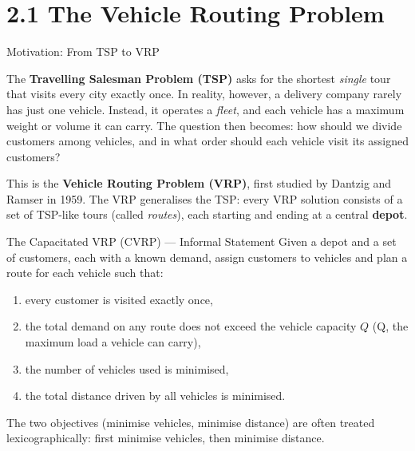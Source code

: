 \documentclass[aspectratio=169,10pt]{beamer}
\begin{document}
\section{2.1 The Vehicle Routing Problem}

\begin{frame}[allowframebreaks]{Motivation: From TSP to VRP}

  The \textbf{Travelling Salesman Problem (TSP)} asks for the shortest
  \emph{single} tour that visits every city exactly once.  In reality, however,
  a delivery company rarely has just one vehicle.  Instead, it operates a
  \emph{fleet}, and each vehicle has a maximum weight or volume it can carry.
  The question then becomes: how should we divide customers among vehicles,
  and in what order should each vehicle visit its assigned customers?

  \bigskip
  This is the \textbf{Vehicle Routing Problem (VRP)}, first studied by
  Dantzig and Ramser in 1959.  The VRP generalises the TSP: every VRP
  solution consists of a set of TSP-like tours (called \emph{routes}), each
  starting and ending at a central \textbf{depot}.

  \bigskip
  \begin{block}{The Capacitated VRP (CVRP) --- Informal Statement}
    Given a depot and a set of customers, each with a known demand, assign
    customers to vehicles and plan a route for each vehicle such that:
    \begin{enumerate}
      \item every customer is visited exactly once,
      \item the total demand on any route does not exceed the vehicle capacity
        $Q$ (Q, the maximum load a vehicle can carry),
      \item the number of vehicles used is minimised,
      \item the total distance driven by all vehicles is minimised.
    \end{enumerate}
  \end{block}

  \medskip
  The two objectives (minimise vehicles, minimise distance) are often treated
  lexicographically: first minimise vehicles, then minimise distance.

  \framebreak


\end{frame}
\end{document}
